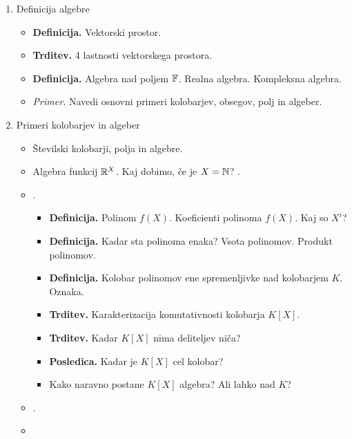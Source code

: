 \begin{enumerate}
    \item Definicija algebre
    \begin{itemize}
        \item \colorbox{purple!30}{\textbf{Definicija.}} Vektorski prostor.
        \item \colorbox{blue!30}{\textbf{Trditev.}} 4 lastnosti vektorskega prostora.
        \item \colorbox{purple!30}{\textbf{Definicija.}} Algebra nad poljem $\mathbb{F}$. Realna algebra. Kompleksna algebra.
        \item \colorbox{yellow!30}{\emph{Primer.}} Navedi osnovni primeri kolobarjev, obsegov, polj in algeber.
    \end{itemize}

    \item Primeri kolobarjev in algeber
    \begin{itemize}
        \item Številski kolobarji, polja in algebre.
        \item Algebra funkcij $\mathbb{R}^X$. Kaj dobimo, če je $X = \mathbb{N}$? .
        \item {}.
        \begin{itemize}
            \item \colorbox{purple!30}{\textbf{Definicija.}} Polinom $f(X)$. Koeficienti polinoma $f(X)$. Kaj so $X^i$?
            \item \colorbox{purple!30}{\textbf{Definicija.}} Kadar sta polinoma enaka? Vsota polinomov. Produkt polinomov.
            \item \colorbox{purple!30}{\textbf{Definicija.}} Kolobar polinomov ene spremenljivke nad kolobarjem $K$. Oznaka.
            \item \colorbox{blue!30}{\textbf{Trditev.}} Karakterizacija komutativnosti kolobarja $K[X]$.
            \item \colorbox{blue!30}{\textbf{Trditev.}} Kadar $K[X]$ nima deliteljev niča?
            \item \colorbox{orange!30}{\textbf{Posledica.}} Kadar je $K[X]$ cel kolobar?
            \item Kako naravno postane $K[X]$ algebra? Ali lahko nad $K$?
        \end{itemize}
        \item {}.
        \item {}
        \begin{itemize}

\end{itemize}
\end{itemize}
\end{enumerate}

